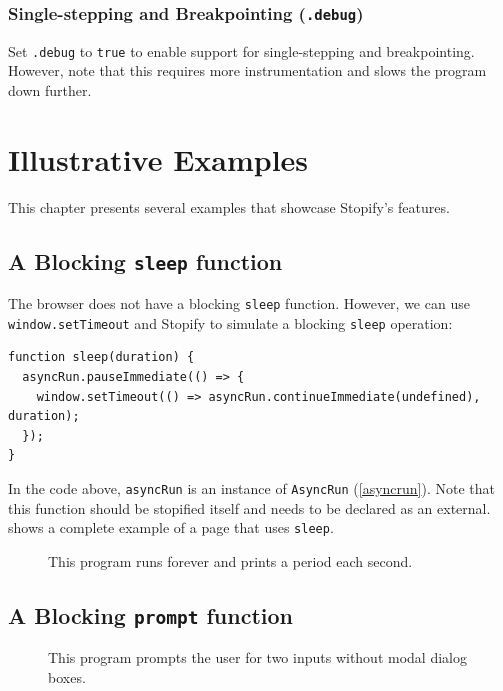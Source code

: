 \documentclass[10pt]{book}
\begin{document}
\subsection{Single-stepping and Breakpointing (\texttt{.debug})\label{debug-flag}}

 Set \lstinline|.debug| to \lstinline|true| to enable
support for single-stepping and breakpointing. However, note that this requires
more instrumentation and slows the program down further.

\chapter{Illustrative Examples\label{illustrative-examples}}

\lstset{language=js}
This chapter presents several examples that showcase Stopify's features.

\section{A Blocking \texttt{sleep} function}

The browser does not have a blocking \lstinline|sleep| function.
However, we can use \lstinline|window.setTimeout| and Stopify to simulate
a blocking \lstinline|sleep| operation:
\begin{lstlisting}
function sleep(duration) {
  asyncRun.pauseImmediate(() => {
    window.setTimeout(() => asyncRun.continueImmediate(undefined), duration);
  });
}
\end{lstlisting}

In the code above, \lstinline|asyncRun| is an instance of \lstinline|AsyncRun|
(\cref{asyncrun}). Note that this function should be stopified itself and
needs to be declared as an external.  shows a complete example
of a page that uses \lstinline|sleep|.

\begin{figure}

\caption{This program runs forever and prints a period each second.}
\label{sleep-complete}
\end{figure}

\section{A Blocking \texttt{prompt} function}

\begin{figure}

\caption{This program prompts the user for two inputs without modal dialog boxes.}
\label{prompt-complete}
\end{figure}
\end{document}
